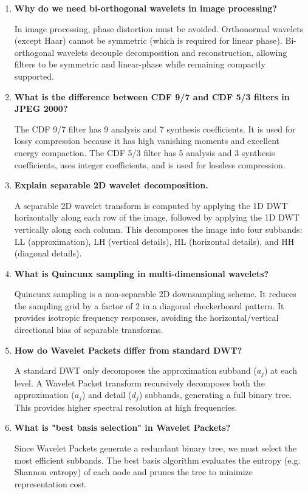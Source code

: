 \documentclass[12pt,a4paper]{article}
\newcommand{\Q}[1]{\textbf{#1}\par\noindent\ignorespaces}
\begin{document}
\begin{tcolorbox}[exambox, title={\textbf{Frequently Asked / Viva Questions}}]
\begin{enumerate}[topsep=0pt, label=\textbf{Q\arabic*.}, itemsep=5pt]
  \item \Q{Why do we need bi-orthogonal wavelets in image processing?}
        In image processing, phase distortion must be avoided. Orthonormal wavelets (except Haar) cannot be symmetric (which is required for linear phase). Bi-orthogonal wavelets decouple decomposition and reconstruction, allowing filters to be symmetric and linear-phase while remaining compactly supported.

  \item \Q{What is the difference between CDF 9/7 and CDF 5/3 filters in JPEG 2000?}
        The CDF 9/7 filter has 9 analysis and 7 synthesis coefficients. It is used for lossy compression because it has high vanishing moments and excellent energy compaction. The CDF 5/3 filter has 5 analysis and 3 synthesis coefficients, uses integer coefficients, and is used for lossless compression.

  \item \Q{Explain separable 2D wavelet decomposition.}
        A separable 2D wavelet transform is computed by applying the 1D DWT horizontally along each row of the image, followed by applying the 1D DWT vertically along each column. This decomposes the image into four subbands: LL (approximation), LH (vertical details), HL (horizontal details), and HH (diagonal details).

  \item \Q{What is Quincunx sampling in multi-dimensional wavelets?}
        Quincunx sampling is a non-separable 2D downsampling scheme. It reduces the sampling grid by a factor of 2 in a diagonal checkerboard pattern. It provides isotropic frequency responses, avoiding the horizontal/vertical directional bias of separable transforms.

  \item \Q{How do Wavelet Packets differ from standard DWT?}
        A standard DWT only decomposes the approximation subband ($a_j$) at each level. A Wavelet Packet transform recursively decomposes both the approximation ($a_j$) and detail ($d_j$) subbands, generating a full binary tree. This provides higher spectral resolution at high frequencies.

  \item \Q{What is "best basis selection" in Wavelet Packets?}
        Since Wavelet Packets generate a redundant binary tree, we must select the most efficient subbands. The best basis algorithm evaluates the entropy (e.g. Shannon entropy) of each node and prunes the tree to minimize representation cost.
\end{enumerate}
\end{tcolorbox}
\end{document}
